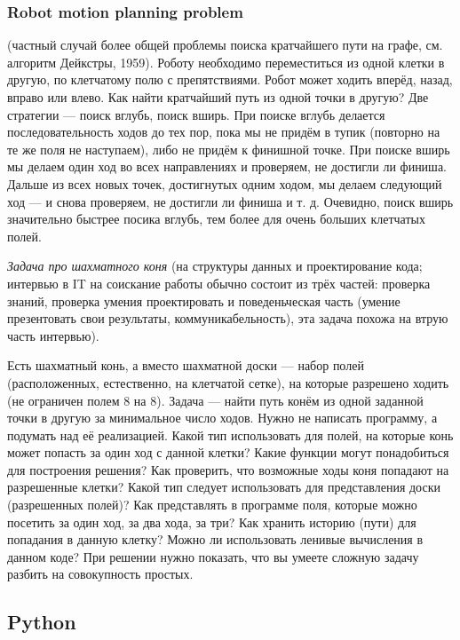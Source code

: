 \documentclass{book}
\begin{document}
\subsubsection{Robot motion planning problem} (частный случай более общей проблемы поиска кратчайшего пути на графе, см. алгоритм Дейкстры,
1959). Роботу необходимо переместиться из одной клетки в другую, по клетчатому полю с препятствиями. Робот может ходить вперёд, назад,
вправо или влево. Как найти кратчайший путь из одной точки в другую?
Две стратегии --- поиск вглубь, поиск вширь. При поиске вглубь делается последовательность ходов до тех пор, пока мы не придём в тупик
(повторно на те же поля не наступаем), либо не придём к финишной точке. При поиске вширь мы делаем один ход во всех направлениях и
проверяем, не достигли ли финиша. Дальше из всех новых точек, достигнутых одним ходом, мы делаем следующий ход --- и снова проверяем, не
достигли ли финиша и т. д. Очевидно, поиск вширь значительно быстрее посика вглубь, тем более для очень больших клетчатых полей.

\textit{Задача про шахматного коня} (на структуры данных и проектирование кода; интервью в IT на соискание работы обычно состоит из трёх
частей: проверка знаний, проверка умения проектировать и поведеньческая часть (умение презентовать свои результаты, коммуникабельность), эта
задача похожа на втрую часть интервью).

Есть шахматный конь, а вместо шахматной доски --- набор полей (расположенных, естественно, на клетчатой сетке), на которые разрешено ходить
(не ограничен полем 8 на 8). Задача --- найти путь конём из одной заданной точки в другую за минимальное число ходов. Нужно не написать
программу, а подумать над её реализацией. Какой тип использовать для полей, на которые конь может попасть за один ход с данной клетки? Какие
функции могут понадобиться для построения решения? Как проверить, что возможные ходы коня попадают на разрешенные клетки? Какой тип следует
использовать для представления доски (разрешенных полей)? Как представлять в программе поля, которые можно посетить за один ход, за два
хода, за три? Как хранить историю (пути) для попадания в данную клетку? Можно ли использовать ленивые вычисления в данном коде? При решении
нужно показать, что вы умеете сложную задачу разбить на совокупность простых.

\subsection{Python}
\end{document}
